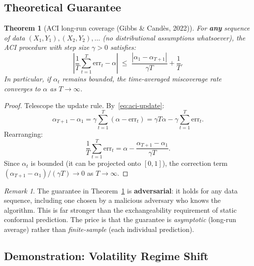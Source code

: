 \documentclass[11pt, a4paper]{article}
\theoremstyle{definition}
\theoremstyle{plain}
\newtheorem{theorem}{Theorem}[section]
\theoremstyle{remark}
\newtheorem{remark}{Remark}[section]
\begin{document}
\subsection{Theoretical Guarantee}

\begin{theorem}[ACI long-run coverage (Gibbs \& Cand\`{e}s, 2022)]
\label{thm:aci}
For \textbf{any} sequence of data $(X_1, Y_1), (X_2, Y_2), \ldots$ (no
distributional assumptions whatsoever), the ACI procedure with step size
$\gamma > 0$ satisfies:
\begin{equation}\label{eq:aci-guarantee}
    \left|\frac{1}{T} \sum_{t=1}^{T} \mathrm{err}_t - \alpha\right|
    \;\leq\; \frac{|\alpha_1 - \alpha_{T+1}|}{\gamma T}
    + \frac{1}{T}.
\end{equation}
In particular, if $\alpha_t$ remains bounded, the time-averaged miscoverage
rate converges to $\alpha$ as $T \to \infty$.
\end{theorem}

\begin{proof}
Telescope the update rule.
By~\eqref{eq:aci-update}:
\[
    \alpha_{T+1} - \alpha_1 = \gamma \sum_{t=1}^{T} (\alpha - \mathrm{err}_t)
    = \gamma T \alpha - \gamma \sum_{t=1}^{T} \mathrm{err}_t.
\]
Rearranging:
\[
    \frac{1}{T} \sum_{t=1}^{T} \mathrm{err}_t
    = \alpha - \frac{\alpha_{T+1} - \alpha_1}{\gamma T}.
\]
Since $\alpha_t$ is bounded (it can be projected onto $[0, 1]$), the correction
term $(\alpha_{T+1} - \alpha_1) / (\gamma T) \to 0$ as $T \to \infty$.
\end{proof}

\begin{remark}
The guarantee in Theorem~\ref{thm:aci} is \textbf{adversarial}: it holds for
any data sequence, including one chosen by a malicious adversary who knows the
algorithm.
This is far stronger than the exchangeability requirement of static conformal
prediction.
The price is that the guarantee is \emph{asymptotic} (long-run average) rather
than \emph{finite-sample} (each individual prediction).
\end{remark}

\subsection{Demonstration: Volatility Regime Shift}
\end{document}
